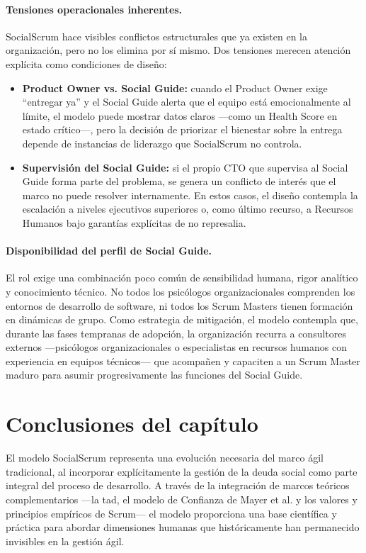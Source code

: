 \paragraph{Tensiones operacionales inherentes.}
SocialScrum hace visibles conflictos estructurales que ya existen en la organización, pero no los elimina por sí mismo.
Dos tensiones merecen atención explícita como condiciones de diseño:

\begin{itemize}
    \item \textbf{Product Owner vs. Social Guide:} cuando el Product Owner exige ``entregar ya'' y el Social Guide alerta que el equipo está emocionalmente al límite, el modelo puede mostrar datos claros ---como un Health Score en estado crítico---, pero la decisión de priorizar el bienestar sobre la entrega depende de instancias de liderazgo que SocialScrum no controla.
    \item \textbf{Supervisión del Social Guide:} si el propio CTO que supervisa al Social Guide forma parte del problema, se genera un conflicto de interés que el marco no puede resolver internamente. En estos casos, el diseño contempla la escalación a niveles ejecutivos superiores o, como último recurso, a Recursos Humanos bajo garantías explícitas de no represalia.
\end{itemize}

\paragraph{Disponibilidad del perfil de Social Guide.}
El rol exige una combinación poco común de sensibilidad humana, rigor analítico y conocimiento técnico.
No todos los psicólogos organizacionales comprenden los entornos de desarrollo de software, ni todos los Scrum Masters tienen formación en dinámicas de grupo.
Como estrategia de mitigación, el modelo contempla que, durante las fases tempranas de adopción, la organización recurra a consultores externos ---psicólogos organizacionales o especialistas en recursos humanos con experiencia en equipos técnicos--- que acompañen y capaciten a un Scrum Master maduro para asumir progresivamente las funciones del Social Guide.

\section{Conclusiones del capítulo}
\label{sec:conclusiones_capitulo3}

El modelo SocialScrum representa una evolución necesaria del marco ágil tradicional, al incorporar explícitamente la gestión de la deuda social como parte integral del proceso de desarrollo.
A través de la integración de marcos teóricos complementarios —la \acrfull{tad}, el modelo de Confianza de Mayer et al. y los valores y principios empíricos de Scrum— el modelo proporciona una base científica y práctica para abordar dimensiones humanas que históricamente han permanecido invisibles en la gestión ágil.


